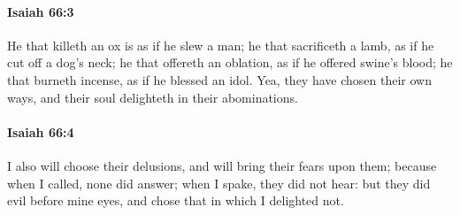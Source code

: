 		\paragraph{Isaiah 66:3} %
			\label{ISAIAH-66-3}

			He that killeth an ox is as if he slew a man; he that sacrificeth a lamb, as if he cut off a dog's neck; he that offereth an oblation, as if he offered swine's blood; he that burneth incense, as if he blessed an idol. Yea, they have chosen their own ways, and their soul delighteth in their abominations.


		\paragraph{Isaiah 66:4} %
			\label{ISAIAH-66-4}

			I also will choose their delusions, and will bring their fears upon them; because when I called, none did answer; when I spake, they did not hear: but they did evil before mine eyes, and chose that in which I delighted not.

